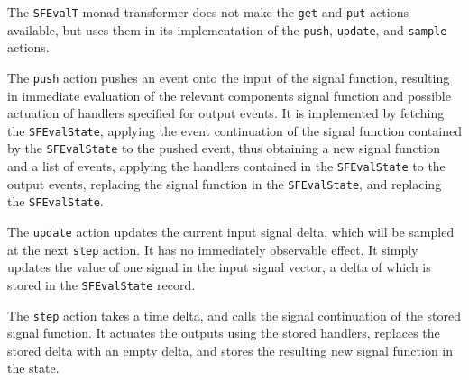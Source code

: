 The {\tt SFEvalT} monad transformer does not make the {\tt get} and {\tt put}
actions available, but uses them in its implementation of the {\tt push},
{\tt update}, and {\tt sample} actions.

The {\tt push} action pushes an event onto the input of the signal function,
resulting in immediate evaluation of the relevant components signal function
and possible actuation of handlers specified for output events. It is
implemented by fetching the {\tt SFEvalState}, applying the event continuation
of the signal function contained by the {\tt SFEvalState} to the pushed event,
thus obtaining a new signal function and a list of events, applying the handlers
contained in the {\tt SFEvalState} to the output events, replacing the signal
function in the {\tt SFEvalState}, and replacing the {\tt SFEvalState}.

The {\tt update} action updates the current input signal delta, which will be
sampled at the next {\tt step} action. It has no immediately observable effect.
It simply updates the value of one signal in the input signal vector, a delta
of which is stored in the {\tt SFEvalState} record.

The {\tt step} action takes a time delta, and calls the signal continuation of
the stored signal function. It actuates the outputs using the stored handlers,
replaces the stored delta with an empty delta, and stores the resulting new
signal function in the state.
